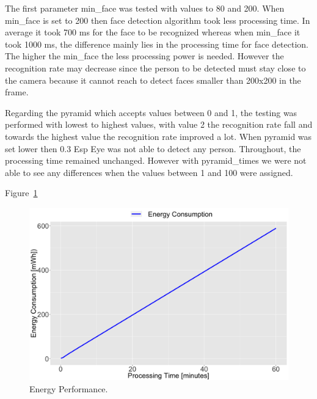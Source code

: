 The first parameter {\selectfont min\_face} was tested with values to 80 and 200. When {\selectfont min\_face} is set to 200 then face detection algorithm took less processing time. In average it took 700 ms for the face to be recognized whereas when {\selectfont min\_face} it took 1000 ms, the difference mainly lies in the processing time for face detection. The higher the {\selectfont min\_face} the less processing power is needed. However the recognition rate may decrease since the person to be detected must stay close to the camera because it cannot reach to detect faces smaller than 200x200 in the frame. 


Regarding the {\selectfont pyramid} which accepts values between 0 and 1, the testing was performed with lowest to highest values, with value 2 the recognition rate fall and towards the highest value the recognition rate improved a lot. When {\selectfont pyramid} was set lower then 0.3 Esp Eye was not able to detect any person.  Throughout, the processing time remained unchanged. However with {\selectfont pyramid\_times} we were not able to see any differences when the values between 1 and 100 were assigned.  


Figure~\ref{fig:energy}



\begin{figure}[!htb]
    \centering
    \includegraphics[width=1\textwidth]{figures/energy.png}
    \caption{Energy Performance.}
    \label{fig:energy}
\end{figure}